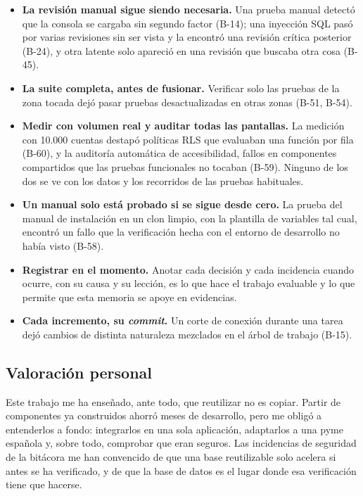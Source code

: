 \begin{itemize}
  \item \textbf{La revisión manual sigue siendo necesaria.} Una prueba
        manual detectó que la consola se cargaba sin segundo factor (B-14);
        una inyección SQL pasó por varias revisiones sin ser vista y la
        encontró una revisión crítica posterior (B-24), y otra latente solo
        apareció en una revisión que buscaba otra cosa (B-45).
  \item \textbf{La suite completa, antes de fusionar.} Verificar solo las
        pruebas de la zona tocada dejó pasar pruebas desactualizadas en
        otras zonas (B-51, B-54).
  \item \textbf{Medir con volumen real y auditar todas las pantallas.} La
        medición con 10.000 cuentas destapó políticas RLS que evaluaban una
        función por fila (B-60), y la auditoría automática de accesibilidad,
        fallos en componentes compartidos que las pruebas funcionales no
        tocaban (B-59). Ninguno de los dos se ve con los datos y los recorridos
        de las pruebas habituales.
  \item \textbf{Un manual solo está probado si se sigue desde cero.} La
        prueba del manual de instalación en un clon limpio, con la plantilla
        de variables tal cual, encontró un fallo que la verificación hecha
        con el entorno de desarrollo no había visto (B-58).
  \item \textbf{Registrar en el momento.} Anotar cada decisión y cada
        incidencia cuando ocurre, con su causa y su lección, es lo que hace
        el trabajo evaluable y lo que permite que esta memoria se apoye en
        evidencias.
  \item \textbf{Cada incremento, su \textit{commit}.} Un corte de conexión
        durante una tarea dejó cambios de distinta naturaleza mezclados en el
        árbol de trabajo (B-15).
\end{itemize}

\subsection{Valoración personal}

Este trabajo me ha enseñado, ante todo, que reutilizar no es copiar. Partir
de componentes ya construidos ahorró meses de desarrollo, pero me obligó a
entenderlos a fondo: integrarlos en una sola aplicación, adaptarlos a una
pyme española y, sobre todo, comprobar que eran seguros. Las incidencias de
seguridad de la bitácora me han convencido de que una base reutilizable solo
acelera si antes se ha verificado, y de que la base de datos es el lugar
donde esa verificación tiene que hacerse.

